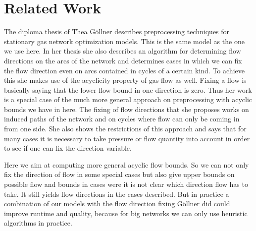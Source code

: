 \section{Related Work}
The diploma thesis of Thea Göllner \cite{DiplomarbeitTheaGoellner} describes preprocessing techniques for stationary gas 
network optimization models. This is the same model as the one we use here. In her thesis she also describes an 
algorithm for determining flow directions on the arcs of the network and determines cases in which we can fix the flow 
direction even on arcs contained in cycles of a certain kind. To achieve this she makes use of the acyclicity property 
of gas flow as well. 
Fixing a flow is basically saying that the lower flow bound in one direction is zero. Thus her work is a special case 
of the much more general approach on preprocessing with acyclic bounds we have in here. The fixing of flow directions 
that she proposes works on induced paths of the network and on cycles where flow can only be coming in from one side. 
She also shows the restrictions of this approach and says that for many cases it is necessary to take pressure or flow 
quantity into account in order to see if one can fix the direction variable. 

Here we aim at computing more general acyclic flow bounds. So we can not only fix the direction of flow in some special 
cases but also give upper bounds on possible flow and bounds in cases were it is not clear which direction flow has to 
take. It still yields flow directions in the cases described. But in practice a combination of our models with the 
flow direction fixing Göllner did could improve runtime and quality, because for big networks we can only use heuristic 
algorithms in practice.
